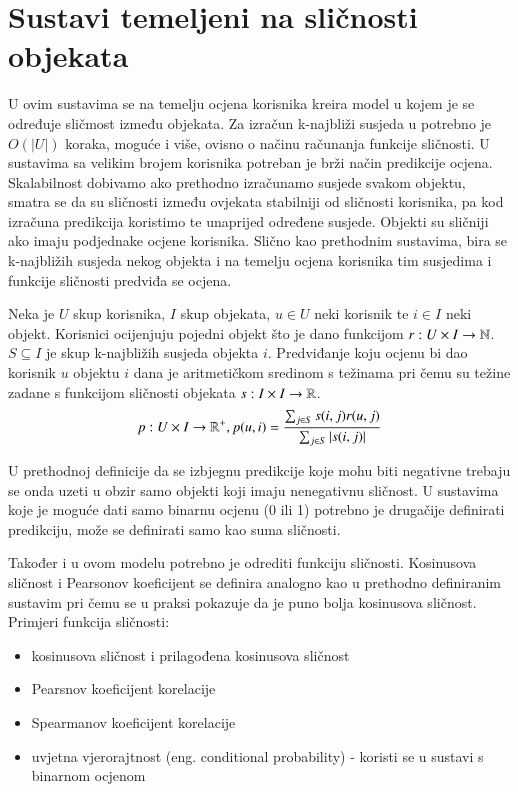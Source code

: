 \documentclass[a4paper,oneside,12pt]{memoir} %
\begin{document}
\section{Sustavi temeljeni na sličnosti objekata}
\par U ovim sustavima se na temelju ocjena korisnika kreira model u kojem je se određuje sličmost između objekata. Za izračun k-najbliži susjeda u potrebno je $O(|U|)$ koraka, moguće i više, ovisno o načinu računanja funkcije sličnosti. U sustavima sa velikim brojem korisnika potreban je brži način predikcije ocjena. Skalabilnost dobivamo ako prethodno izračunamo susjede svakom objektu, smatra se da su sličnosti između ovjekata stabilniji od sličnosti korisnika, pa kod izračuna predikcija koristimo te unaprijed određene susjede. Objekti su sličniji ako imaju podjednake ocjene korisnika. Slično kao prethodnim sustavima, bira se k-najbližih susjeda nekog objekta i na temelju ocjena korisnika tim susjedima i funkcije sličnosti predviđa se ocjena.
\begin{defn}
Neka je $U$ skup korisnika, $I$ skup objekata, $u\in U$ neki korisnik te $i\in I$ neki objekt. Korisnici ocijenjuju pojedni objekt što je dano funkcijom $r:U\times I \rightarrow \mathbb{N}$. $S \subseteq I$ je skup k-najbližih susjeda objekta $i$. Predviđanje koju ocjenu bi dao korisnik $u$ objektu $i$ dana je aritmetičkom sredinom s težinama pri čemu su težine zadane s funkcijom sličnosti objekata $s:I\times I\rightarrow \mathbb{R}$. 
\[ p:U\times I \rightarrow \mathbb{R}^+, p(u,i) = \frac{\sum_{j\in S}s(i,j)r(u,j)}{\sum_{j\in S}|s(i,j)|} \]
\end{defn}
\begin{rem}
U prethodnoj definicije da se izbjegnu predikcije koje mohu biti negativne trebaju se onda uzeti u obzir samo objekti koji imaju nenegativnu sličnost. U sustavima koje je moguće dati samo binarnu ocjenu (0 ili 1) potrebno je drugačije definirati predikciju, može se definirati samo kao suma sličnosti.
\end{rem}
Također i u ovom modelu potrebno je odrediti funkciju sličnosti. Kosinusova sličnost i Pearsonov koeficijent se definira analogno kao u prethodno definiranim sustavim pri čemu se u praksi pokazuje da je puno bolja kosinusova sličnost.
\bigskip
\\Primjeri funkcija sličnosti:
\begin{itemize}[topsep=2pt]
\setlength{\parskip}{0pt}
\item kosinusova sličnost i prilagođena kosinusova sličnost
\item Pearsnov koeficijent korelacije 
\item Spearmanov koeficijent korelacije 
\item uvjetna vjerorajtnost (eng. conditional probability) - koristi se u sustavi s binarnom ocjenom
\end{itemize}
\end{document}
